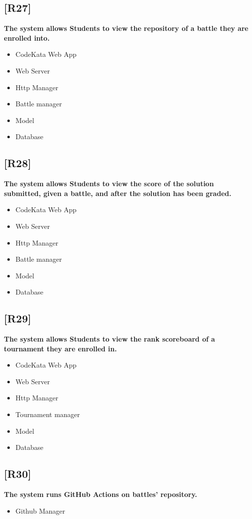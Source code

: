\documentclass{article}
\begin{document}
\subsection{[R27]}
\textbf{ The system allows Students to view the repository of a battle they are enrolled into.}
\begin{itemize}
\item CodeKata Web App
\item Web Server
\item Http Manager
\item Battle manager
\item Model
\item Database
\end{itemize}
\subsection{[R28]}
\textbf{ The system allows Students to view the score of the solution submitted, given a battle, and after the solution has been graded.}
\begin{itemize}
\item CodeKata Web App
\item Web Server
\item Http Manager
\item Battle manager
\item Model
\item Database
\end{itemize}
\subsection{[R29]}
\textbf{ The system allows Students to view the rank scoreboard of a tournament they are enrolled in.}
\begin{itemize}
\item CodeKata Web App
\item Web Server
\item Http Manager
\item Tournament manager
\item Model
\item Database
\end{itemize}
\subsection{[R30]}
\textbf{ The system runs GitHub Actions on battles’ repository.}
\begin{itemize}
\item Github Manager
\end{itemize}
\end{document}
